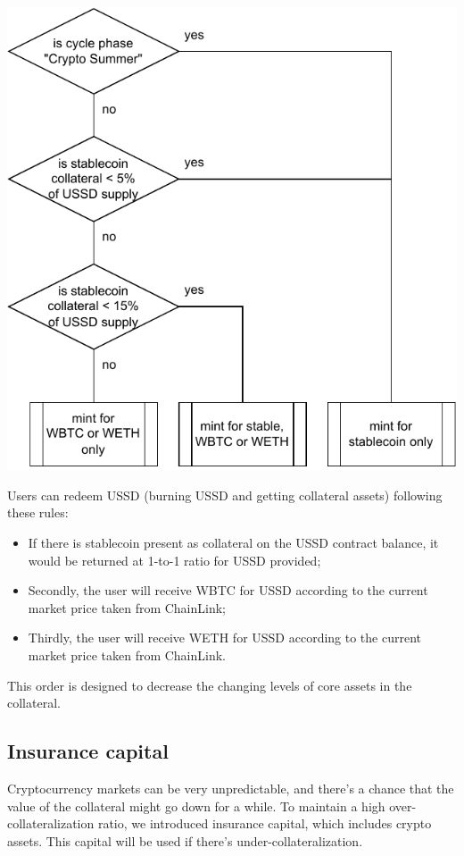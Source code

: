 \centerline{\includegraphics[scale=0.8]{image_mint.pdf}}

Users can redeem USSD (burning USSD and getting collateral assets) following these rules:

\begin{itemize}
	\item If there is stablecoin present as collateral on the USSD contract balance, it would be returned at 1-to-1 ratio for USSD provided;
	\item Secondly, the user will receive WBTC for USSD according to the current market price taken from ChainLink;
	\item Thirdly, the user will receive WETH for USSD according to the current market price taken from ChainLink.
\end{itemize}

This order is designed to decrease the changing levels of core assets in the collateral.

\subsection{Insurance capital}

Cryptocurrency markets can be very unpredictable, and there's a chance that the value of the collateral might go down for a while. To maintain a high over-collateralization ratio, we introduced insurance capital, which includes crypto assets. This capital will be used if there's under-collateralization.

